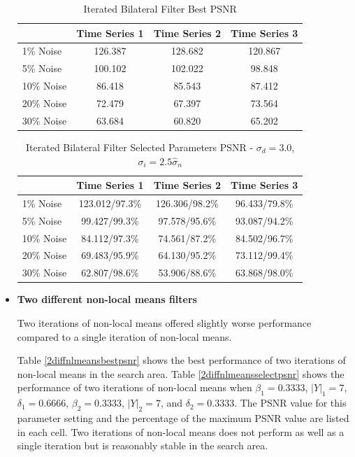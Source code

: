 \documentclass[11pt]{article}
\theoremstyle{definition}
\begin{document}
\begin{itemize}
\begin{table}[!h]
\small
\begin{center}
\begin{tabular}{lccc}
\hline
 & Time Series 1 & Time Series 2 & Time Series 3 \\ \hline
1\% Noise & 126.387 & 128.682 & 120.867 \\ \hline
5\% Noise & 100.102 & 102.022 & 98.848 \\ \hline
10\% Noise & 86.418 & 85.543 & 87.412 \\ \hline
20\% Noise & 72.479 & 67.397 & 73.564 \\ \hline
30\% Noise & 63.684 & 60.820 & 65.202 \\ \hline
\end{tabular}
\caption{Iterated Bilateral Filter Best PSNR}
\label{itrbilateralbestpsnr}
\end{center}
\end{table}

\begin{table}[!h]
\small
\begin{center}
\begin{tabular}{lccc}
\hline 
 & Time Series 1 & Time Series 2 & Time Series 3 \\ \hline
1\% Noise & 123.012/97.3\% & 126.306/98.2\% & 96.433/79.8\% \\ \hline
5\% Noise & 99.427/99.3\% & 97.578/95.6\% & 93.087/94.2\% \\ \hline
10\% Noise & 84.112/97.3\% & 74.561/87.2\% & 84.502/96.7\% \\ \hline
20\% Noise & 69.483/95.9\% & 64.130/95.2\% & 73.112/99.4\% \\ \hline
30\% Noise & 62.807/98.6\% & 53.906/88.6\% & 63.868/98.0\% \\ \hline
\end{tabular}
\caption{Iterated Bilateral Filter Selected Parameters PSNR - $\sigma_d = 3.0$, $\sigma_i = 2.5 \hat{\sigma}_n$}
\label{itrbilateralselectpsnr}
\end{center}
\end{table}

\item \textbf{Two different non-local means filters} 

  Two iterations of non-local means offered slightly worse performance
  compared to a single iteration of non-local means.

  Table \ref{2diffnlmeansbestpsnr} shows the best performance of two
  iterations of non-local means in the search area. Table
  \ref{2diffnlmeansselectpsnr} shows the performance of two iterations
  of non-local means when $\beta_1 = 0.3333$, $\lvert Y \rvert _1 =
  7$, $\delta _1 = 0.6666$, $\beta_2 = 0.3333$, $\lvert Y \rvert _2 =
  7$, and $\delta _2 = 0.3333$. The PSNR value for this parameter
  setting and the percentage of the maximum PSNR value are listed in
  each cell. Two iterations of non-local means does not perform as
  well as a single iteration but is reasonably stable in the search
  area.


\end{itemize}
\end{document}
